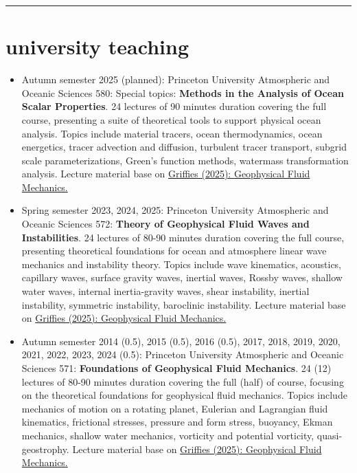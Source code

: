\documentclass{article}
\begin{document}
\noindent\rule{\textwidth}{1pt}
\vspace{-1cm}
\section*{\sc  \color{Maroon}  university teaching}
\vspace{-.3cm}

\begin{itemize}[leftmargin=*]

\item Autumn semester 2025 (planned): Princeton University Atmospheric and Oceanic Sciences 580: Special topics: {\bf Methods in the Analysis of Ocean Scalar Properties}. 24 lectures of 90 minutes duration covering the full course, presenting a suite of theoretical tools to support physical ocean analysis. Topics include material tracers, ocean thermodynamics, ocean energetics, tracer advection and diffusion, turbulent tracer transport, subgrid scale parameterizations, Green's function methods, watermass transformation analysis. Lecture material base on \href{https://stephengriffies.github.io/assets/pdfs/GFM_lectures.pdf}{Griffies (2025): Geophysical Fluid Mechanics.}

\item Spring semester 2023, 2024, 2025: Princeton University Atmospheric and Oceanic Sciences 572: {\bf Theory of Geophysical Fluid Waves and Instabilities}. 24 lectures of 80-90 minutes duration covering the full course, presenting theoretical foundations for ocean and atmosphere linear wave mechanics and instability theory. Topics include wave kinematics, acoustics, capillary waves, surface gravity waves, inertial waves, Rossby waves, shallow water waves, internal inertia-gravity waves, shear instability, inertial instability, symmetric instability, baroclinic instability. Lecture material base on \href{https://stephengriffies.github.io/assets/pdfs/GFM_lectures.pdf}{Griffies (2025): Geophysical Fluid Mechanics.}

\item Autumn semester 2014 (0.5), 2015 (0.5), 2016 (0.5), 2017, 2018, 2019, 2020, 2021, 2022, 2023, 2024 (0.5): Princeton University Atmospheric and Oceanic Sciences 571: {\bf  Foundations of Geophysical Fluid Mechanics}. 24 (12) lectures of 80-90 minutes duration covering the full (half) of course, focusing on the theoretical foundations for geophysical fluid mechanics. Topics include mechanics of motion on a rotating planet, Eulerian and Lagrangian fluid kinematics, frictional stresses, pressure and form stress, buoyancy, Ekman mechanics, shallow water mechanics, vorticity and potential vorticity, quasi-geostrophy. Lecture material base on \href{https://stephengriffies.github.io/assets/pdfs/GFM_lectures.pdf}{Griffies (2025): Geophysical Fluid Mechanics.}


\end{itemize}
\end{document}
